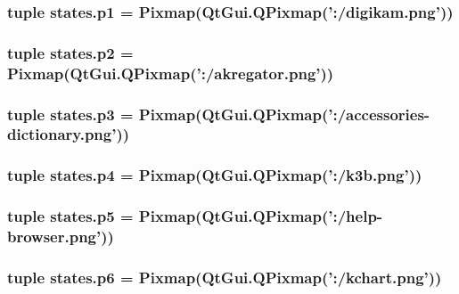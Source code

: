 \subsubsection[{p1}]{\setlength{\rightskip}{0pt plus 5cm}tuple states.\+p1 = {\bf Pixmap}(Qt\+Gui.\+Q\+Pixmap('\+:/digikam.\+png'))}\label{namespacestates_ae8f66049ab43399ddd8c9f0a2f9ce543}
\hypertarget{namespacestates_af640837772eb5d6c61bd58181140f633}{}
\subsubsection[{p2}]{\setlength{\rightskip}{0pt plus 5cm}tuple states.\+p2 = {\bf Pixmap}(Qt\+Gui.\+Q\+Pixmap('\+:/akregator.\+png'))}\label{namespacestates_af640837772eb5d6c61bd58181140f633}
\hypertarget{namespacestates_ae4b38fcb744ae566b88b485f02878151}{}
\subsubsection[{p3}]{\setlength{\rightskip}{0pt plus 5cm}tuple states.\+p3 = {\bf Pixmap}(Qt\+Gui.\+Q\+Pixmap('\+:/accessories-\/dictionary.\+png'))}\label{namespacestates_ae4b38fcb744ae566b88b485f02878151}
\hypertarget{namespacestates_ae95b6fb201789c37779562e26ec003e1}{}
\subsubsection[{p4}]{\setlength{\rightskip}{0pt plus 5cm}tuple states.\+p4 = {\bf Pixmap}(Qt\+Gui.\+Q\+Pixmap('\+:/k3b.\+png'))}\label{namespacestates_ae95b6fb201789c37779562e26ec003e1}
\hypertarget{namespacestates_a13a93410c33d08164a73183010d5cd56}{}
\subsubsection[{p5}]{\setlength{\rightskip}{0pt plus 5cm}tuple states.\+p5 = {\bf Pixmap}(Qt\+Gui.\+Q\+Pixmap('\+:/{\bf help}-\/browser.\+png'))}\label{namespacestates_a13a93410c33d08164a73183010d5cd56}
\hypertarget{namespacestates_aec211bdb12ccd4197e5570600270d829}{}
\subsubsection[{p6}]{\setlength{\rightskip}{0pt plus 5cm}tuple states.\+p6 = {\bf Pixmap}(Qt\+Gui.\+Q\+Pixmap('\+:/kchart.\+png'))}\label{namespacestates_aec211bdb12ccd4197e5570600270d829}
\hypertarget{namespacestates_a5b980a981bd9d978c035fbbab0e3beed}{}
